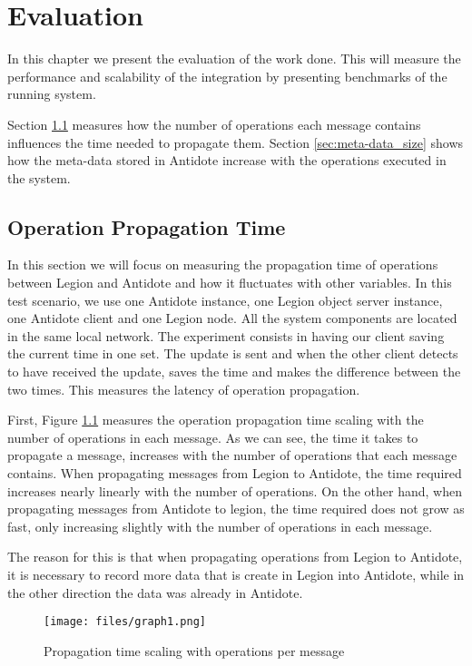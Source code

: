 \chapter{Evaluation}
\label{cha:evaluation}
In this chapter we present the evaluation of the work done. This will measure the performance and scalability of the integration by presenting benchmarks of the running system.\par
	Section \ref{sec:operation_propagation_time} measures how the number of operations each message contains influences the time needed to propagate them. Section \ref{sec:meta-data_size} shows how the meta-data stored in Antidote increase with the operations executed in the system.

\section{Operation Propagation Time}
\label{sec:operation_propagation_time}
In this section we will focus on measuring the propagation time of operations between Legion and Antidote and how it fluctuates with other variables. In this test scenario, we use one Antidote instance, one Legion object server instance, one Antidote client and one Legion node. All the system components are located in the same local network. The experiment consists in having our client saving the current time in one set. The update is sent and when the other client detects to have received the update, saves the time and makes the difference between the two times. This measures the latency of operation propagation.\par
	First, Figure \ref{graph1} measures the operation propagation time scaling with the number of operations in each message. As we can see, the time it takes to propagate a message, increases with the number of operations that each message contains. When propagating messages from Legion to Antidote, the time required increases nearly linearly with the number of operations. On the other hand, when propagating messages from Antidote to legion, the time required does not grow as fast, only increasing slightly with the number of operations in each message.\par
	The reason for this is that when propagating operations from Legion to Antidote, it is necessary to record more data that is create in Legion into Antidote, while in the other direction the data was already in Antidote.

\begin{figure}[H]
\centering
\texttt{[image: files/graph1.png]}
\caption{Propagation time scaling with operations per message}
\label{graph1}
\end{figure}

